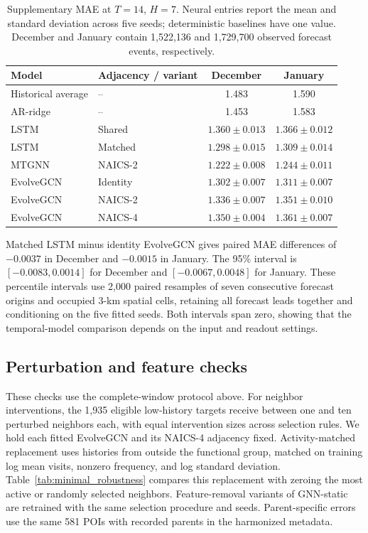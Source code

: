 \documentclass[preprint,authoryear,11pt]{elsarticle}
\theoremstyle{definition}
\begin{document}
\begin{table}[!htbp]
\centering
\begingroup
\singlespacing
\fontsize{9pt}{11pt}\selectfont
\caption{Supplementary MAE at \(T=14\), \(H=7\). Neural entries report the mean and standard deviation across five seeds; deterministic baselines have one value. December and January contain 1,522,136 and 1,729,700 observed forecast events, respectively.}
\label{tab:minimal_forecasting}
\setlength{\tabcolsep}{5pt}
\begin{tabular}{llcc}
\toprule
Model & Adjacency / variant & December & January \\
\midrule
Historical average & -- & 1.483 & 1.590 \\
AR-ridge & -- & 1.453 & 1.583 \\
LSTM & Shared & \(1.360\pm0.013\) & \(1.366\pm0.012\) \\
LSTM & Matched & \(1.298\pm0.015\) & \(1.309\pm0.014\) \\
MTGNN & NAICS-2 & \(1.222\pm0.008\) & \(1.244\pm0.011\) \\
EvolveGCN & Identity & \(1.302\pm0.007\) & \(1.311\pm0.007\) \\
EvolveGCN & NAICS-2 & \(1.336\pm0.007\) & \(1.351\pm0.010\) \\
EvolveGCN & NAICS-4 & \(1.350\pm0.004\) & \(1.361\pm0.007\) \\
\bottomrule
\end{tabular}
\endgroup
\end{table}

Matched LSTM minus identity EvolveGCN gives paired MAE differences of \(-0.0037\) in December and \(-0.0015\) in January. The 95\% interval is \([-0.0083,0.0014]\) for December and \([-0.0067,0.0048]\) for January. These percentile intervals use 2,000 paired resamples of seven consecutive forecast origins and occupied 3-km spatial cells, retaining all forecast leads together and conditioning on the five fitted seeds. Both intervals span zero, showing that the temporal-model comparison depends on the input and readout settings.

\subsection{Perturbation and feature checks}
\label{app:minimal_robustness}

These checks use the complete-window protocol above. For neighbor interventions, the 1,935 eligible low-history targets receive between one and ten perturbed neighbors each, with equal intervention sizes across selection rules. We hold each fitted EvolveGCN and its NAICS-4 adjacency fixed. Activity-matched replacement uses histories from outside the functional group, matched on training log mean visits, nonzero frequency, and log standard deviation. Table~\ref{tab:minimal_robustness} compares this replacement with zeroing the most active or randomly selected neighbors. Feature-removal variants of GNN-static are retrained with the same selection procedure and seeds. Parent-specific errors use the same 581 POIs with recorded parents in the harmonized metadata.
\end{document}
